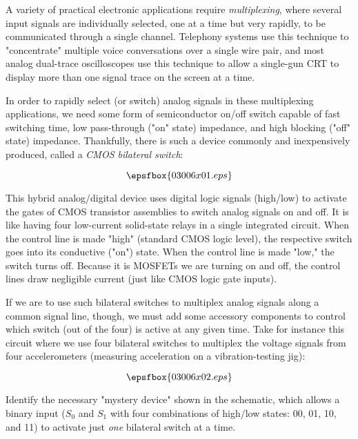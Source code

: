 

A variety of practical electronic applications require {\it multiplexing}, where several input signals are individually selected, one at a time but very rapidly, to be communicated through a single channel.  Telephony systems use this technique to "concentrate" multiple voice conversations over a single wire pair, and most analog dual-trace oscilloscopes use this technique to allow a single-gun CRT to display more than one signal trace on the screen at a time.

In order to rapidly select (or switch) analog signals in these multiplexing applications, we need some form of semiconductor on/off switch capable of fast switching time, low pass-through ("on" state) impedance, and high blocking ("off" state) impedance.  Thankfully, there is such a device commonly and inexpensively produced, called a {\it CMOS bilateral switch}:

$$\epsfbox{03006x01.eps}$$

This hybrid analog/digital device uses digital logic signals (high/low) to activate the gates of CMOS transistor assemblies to switch analog signals on and off.  It is like having four low-current solid-state relays in a single integrated circuit.  When the control line is made "high" (standard CMOS logic level), the respective switch goes into its conductive ("on") state.  When the control line is made "low," the switch turns off.  Because it is MOSFETs we are turning on and off, the control lines draw negligible current (just like CMOS logic gate inputs).

If we are to use such bilateral switches to multiplex analog signals along a common signal line, though, we must add some accessory components to control which switch (out of the four) is active at any given time.  Take for instance this circuit where we use four bilateral switches to multiplex the voltage signals from four accelerometers (measuring acceleration on a vibration-testing jig):

$$\epsfbox{03006x02.eps}$$

Identify the necessary "mystery device" shown in the schematic, which allows a binary input ($S_0$ and $S_1$ with four combinations of high/low states: 00, 01, 10, and 11) to activate just {\it one} bilateral switch at a time.

